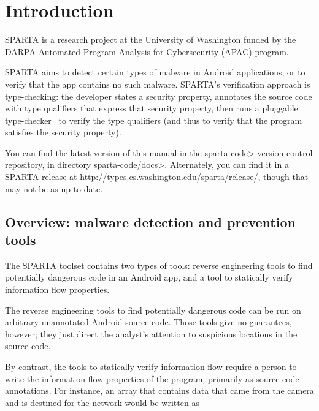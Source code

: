 \htmlhr
\chapter{Introduction\label{introduction}}

SPARTA is a research project at the University of Washington funded by the DARPA
 Automated Program Analysis for Cybersecurity (APAC) program.


SPARTA aims to detect certain types of malware in Android applications, or
to verify that the app contains no such malware.  SPARTA's verification
approach is type-checking:  the developer states a security property,
annotates the source code with type qualifiers that express that security
property, then runs a pluggable type-checker~\cite{PapiACPE2008,DietlDEMS2011} to verify the type
qualifiers (and thus to verify that the program satisfies the security
property).




You can find the latest version of this manual in the \<sparta-code> version
control repository, in directory \<sparta-code/docs>.  Alternately, you can
find it in a SPARTA release at
\url{http://types.cs.washington.edu/sparta/release/}, though that may not
be as up-to-date.


\section{Overview:  malware detection and prevention tools}

The SPARTA toolset contains two types of tools:  reverse engineering tools to find potentially
dangerous code in an Android app, and a tool to statically verify
information flow properties.

The reverse engineering tools to find potentially dangerous code can be run on
arbitrary unannotated Android source code.  Those tools give no guarantees,
however; they just direct the analyst's attention to suspicious locations
in the source code.

By contrast, the tools to statically verify information flow require a person to write
the information flow properties of the program, primarily as source code
annotations.  For instance, an array that contains data that came from the
camera and is destined for the network would be written as 

